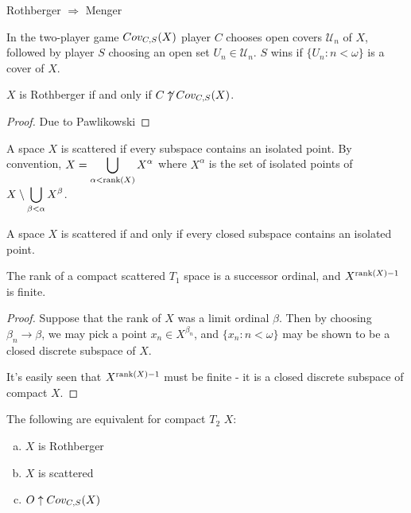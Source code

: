   \begin{proposition}
    Rothberger $\Rightarrow$ Menger
  \end{proposition}

  \begin{definition}
    In the two-player game $Cov_{C,S}(X)$ player $C$ chooses open covers $\mathcal{U}_n$ of $X$, followed by player $S$ choosing an open set $U_n\in\mathcal{U}_n$. $S$ wins if $\{U_n:n<\omega\}$ is a cover of $X$.
  \end{definition}

  \begin{theorem}
    $X$ is Rothberger if and only if $C\not\uparrow Cov_{C,S}(X)$.
  \end{theorem}

  \begin{proof}
    Due to Pawlikowski
  \end{proof}

  \begin{definition}
    A space $X$ is scattered if every subspace contains an isolated point. By convention, $\displaystyle X = \bigcup_{\alpha<\textrm{rank}(X)}X^\alpha$ where $X^\alpha$ is the set of isolated points of $\displaystyle X\setminus\bigcup_{\beta<\alpha}X^\beta$.
  \end{definition}

  \begin{proposition}
    A space $X$ is scattered if and only if every closed subspace contains an isolated point.
  \end{proposition}

  \begin{proposition}
    The rank of a compact scattered $T_1$ space is a successor ordinal, and $X^{\textrm{rank}(X)-1}$ is finite.
  \end{proposition}

  \begin{proof}
    Suppose that the rank of $X$ was a limit ordinal $\beta$. Then by choosing $\beta_n\to\beta$, we may pick a point $x_n\in X^{\beta_n}$, and $\{x_n: n<\omega\}$ may be shown to be a closed discrete subspace of $X$.

    It's easily seen that $X^{\textrm{rank}(X)-1}$ must be finite - it is a closed discrete subspace of compact $X$.
  \end{proof}

  \begin{theorem}
    The following are equivalent for compact $T_2$ $X$:
      \begin{enumerate}[(a)]
        \item $X$ is Rothberger
        \item $X$ is scattered
        \item $O\uparrow Cov_{C,S}(X)$
      \end{enumerate}
  \end{theorem}

